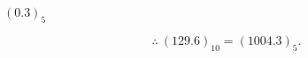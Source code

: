 \begin{minipage}{\linewidth}
\begin{minipage}[t]{.48\linewidth}
$ (0.3)_{5} $
\end{minipage}\par
\[\therefore\ (129.6)_{10}=(1004.3)_{5}.\]
\end{minipage}\par
